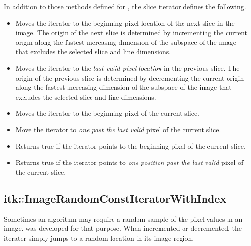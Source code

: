 
In addition to those methods defined for
, the slice iterator defines the following.

\begin{itemize}
\item \textbf{} Moves the iterator to the beginning pixel
location of the next slice in the image.  The origin of the next slice is
determined by incrementing the current origin along the fastest increasing
dimension of the subspace of the image that excludes the selected slice and
line dimensions.

\item \textbf{} Moves the iterator to the \emph{last valid
pixel location} in the previous slice. The origin of the previous slice is
determined by decrementing the current origin along the fastest increasing
dimension of the subspace of the image that excludes the selected slice and
line dimensions.

\item \textbf{} Moves the iterator to the beginning
pixel of the current slice.

\item \textbf{}  Move the iterator to \emph{one past
the last valid} pixel of the current slice.

\item \textbf{} Returns true if the iterator points
to the beginning pixel of the current slice.

\item \textbf{}  Returns true if the iterator points to
\emph{one position past the last valid} pixel of the current slice.
\end{itemize}




\subsection{itk::ImageRandomConstIteratorWithIndex}
\label{sec:itkImageRandomConstIteratorWithIndex}
Sometimes an algorithm may require a random sample of the pixel values in an
image.  was developed for that
purpose. When incremented or decremented, the iterator simply jumps to a random
location in its image region.  

